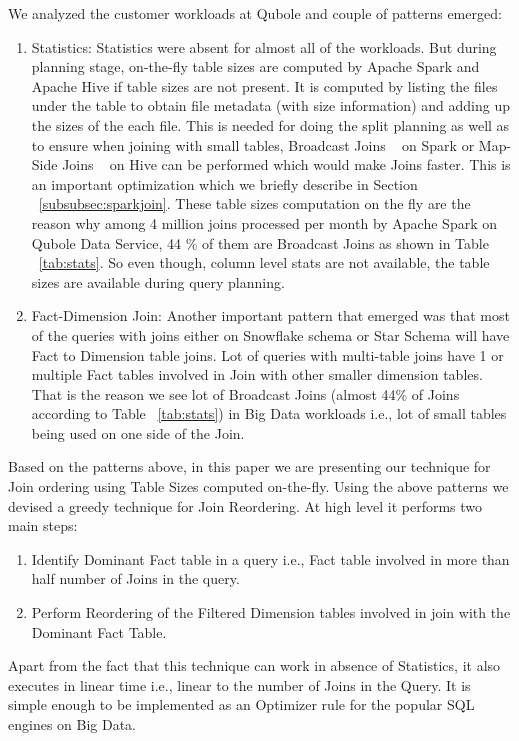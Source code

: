\documentclass[conference]{IEEEtran}
\begin{document}
We analyzed the customer workloads at Qubole and couple of patterns emerged:
\begin{enumerate}
\item Statistics: Statistics were absent for almost all of the workloads. But  during planning stage, on-the-fly table sizes are computed by Apache Spark and Apache Hive if table sizes are not present. It is computed by listing the files under the table to obtain file metadata (with size information) and adding up the sizes of the each file. This is needed for doing the split planning as well as to ensure when joining with small tables, Broadcast Joins ~\cite{b13} on Spark or Map-Side Joins ~\cite{b10} on Hive can be performed which would make Joins faster. This is an important optimization which we briefly describe in Section ~\ref{subsubsec:sparkjoin}. These table sizes computation on the fly are the reason why among 4 million joins processed per month by Apache Spark on Qubole Data Service, 44 \% of them are Broadcast Joins as shown in Table ~\ref{tab:stats}. So even though, column level stats are not available, the table sizes are available during query planning.
\item Fact-Dimension Join: Another important pattern that emerged was that most of the queries with joins either on Snowflake schema or Star Schema will have Fact to Dimension table joins. Lot of queries with multi-table joins have 1 or multiple Fact tables involved in Join with other smaller dimension tables. That is the reason we see lot of Broadcast Joins (almost 44\% of Joins according to Table ~\ref{tab:stats}) in Big Data workloads i.e., lot of small tables being used on one side of the Join.
\end{enumerate}

Based on the patterns above, in this paper we are presenting our technique for Join ordering using Table Sizes computed on-the-fly. Using the above patterns we devised a greedy technique for Join Reordering. At high level it performs two main steps:
\begin{enumerate}
\item Identify Dominant Fact table in a query i.e., Fact table involved in more than half number of Joins in the query. 
\item Perform Reordering of the Filtered Dimension tables involved in join with the Dominant Fact Table.
\end{enumerate}

Apart from the fact that this technique can work in absence of Statistics, it also executes in linear time i.e., linear to the number of Joins in the Query. It is simple enough to be implemented as an Optimizer rule for the popular SQL engines on Big Data.
\end{document}
